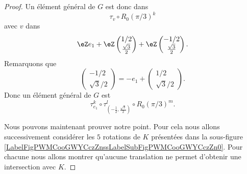 \begin{proof}
	Un élément général de \( G\) est donc dans
	\begin{equation}
		\tau_v\circ R_0(\pi/3)^k
	\end{equation}
	avec \( v\) dans
	\begin{equation}
		\eZ e_1+\eZ\begin{pmatrix}
			1/2 \\
			\frac{ \sqrt{ 3 } }{2}
		\end{pmatrix}
		+\eZ\begin{pmatrix}
			-1/2 \\
			\frac{ \sqrt{ 3 } }{2}
		\end{pmatrix}.
	\end{equation}
	Remarquons que
	\begin{equation}
		\begin{pmatrix}
			-1/2 \\
			\sqrt{ 3 }/2
		\end{pmatrix}=-e_1+\begin{pmatrix}
			1/2 \\
			\sqrt{ 3 }/2
		\end{pmatrix}.
	\end{equation}
	Donc un élément général de \( G\) est
	\begin{equation}
		\tau_{e_1}^k\circ \tau_{(-\frac{ 1 }{2},\frac{ \sqrt{ 3 } }{2})}^l\circ R_0(\pi/3)^m.
	\end{equation}

	Nous pouvons maintenant prouver notre point. Pour cela nous allons successivement considérer les \( 5\) rotations de \( K \) présentées dans la sous-figure \ref{LabelFigPWMCooGWYCczZnssLabelSubFigPWMCooGWYCczZn0}. Pour chacune nous allons montrer qu'aucune translation ne permet d'obtenir une intersection avec \( K\).


\end{proof}
